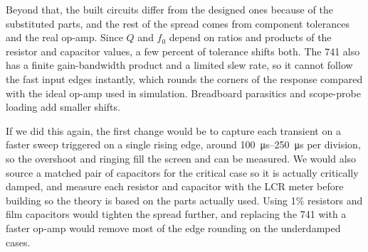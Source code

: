 \documentclass[11pt]{article}
\begin{document}
Beyond that, the built circuits differ from the designed ones because of the
substituted parts, and the rest of the spread comes from component tolerances and
the real op-amp. Since $Q$ and $f_0$ depend on ratios and products of the resistor
and capacitor values, a few percent of tolerance shifts both. The 741 also has a
finite gain-bandwidth product and a limited slew rate, so it cannot follow the fast
input edges instantly, which rounds the corners of the response compared with the
ideal op-amp used in simulation. Breadboard parasitics and scope-probe loading add
smaller shifts.

If we did this again, the first change would be to capture each transient on a
faster sweep triggered on a single rising edge, around
\SIrange{100}{250}{\micro\second} per division, so the overshoot and ringing fill the screen
and can be measured. We would also source a matched pair of capacitors for the
critical case so it is actually critically damped, and measure each resistor and
capacitor with the LCR meter before building so the theory is based on the parts
actually used. Using 1\% resistors and film capacitors would tighten the spread
further, and replacing the 741 with a faster op-amp would remove most of the edge
rounding on the underdamped cases.

\end{document}
